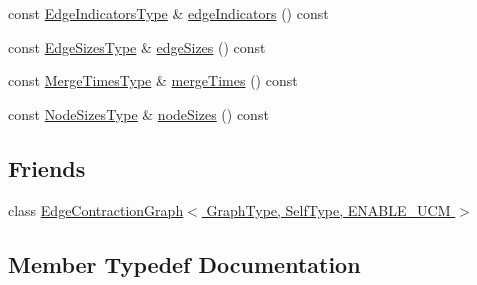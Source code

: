 \begin{DoxyCompactItemize}
\item 
const \hyperlink{classnifty_1_1graph_1_1agglo_1_1MalaClusterPolicy_acc2c04742b370c093267afd17a14bb0c}{Edge\+Indicators\+Type} \& \hyperlink{classnifty_1_1graph_1_1agglo_1_1MalaClusterPolicy_acbdca1b5687d7aee6db6c5d98431cdad}{edge\+Indicators} () const
\item 
const \hyperlink{classnifty_1_1graph_1_1agglo_1_1MalaClusterPolicy_a33924545e782bd520270341b21599e7e}{Edge\+Sizes\+Type} \& \hyperlink{classnifty_1_1graph_1_1agglo_1_1MalaClusterPolicy_a23f13c2b207f52ec47c137985eff2542}{edge\+Sizes} () const
\item 
const \hyperlink{classnifty_1_1graph_1_1agglo_1_1MalaClusterPolicy_aa786f31f24cedb64409047e19eb2e7c4}{Merge\+Times\+Type} \& \hyperlink{classnifty_1_1graph_1_1agglo_1_1MalaClusterPolicy_a1d222663fca06945e4d195d452968e1b}{merge\+Times} () const
\item 
const \hyperlink{classnifty_1_1graph_1_1agglo_1_1MalaClusterPolicy_a559774b548ec31fb481a848a12a45abe}{Node\+Sizes\+Type} \& \hyperlink{classnifty_1_1graph_1_1agglo_1_1MalaClusterPolicy_a8636a540ad4d07428f2fb77d6e24f3c0}{node\+Sizes} () const
\end{DoxyCompactItemize}
\subsection*{Friends}
\begin{DoxyCompactItemize}
\item 
class \hyperlink{classnifty_1_1graph_1_1agglo_1_1MalaClusterPolicy_a6939aa4c6113ba9c44fd5e048687ba92}{Edge\+Contraction\+Graph$<$ Graph\+Type, Self\+Type, E\+N\+A\+B\+L\+E\+\_\+\+U\+C\+M $>$}
\end{DoxyCompactItemize}


\subsection{Member Typedef Documentation}
\mbox{\label{classnifty_1_1graph_1_1agglo_1_1MalaClusterPolicy_a77a5b41304b53955aafbf214e2ad356f}} 
